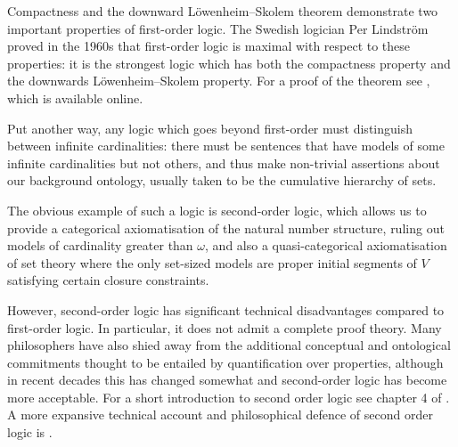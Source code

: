 \documentclass[10pt, a4paper, oneside]{article}
\theoremstyle{definition}
\theoremstyle{remark}
\theoremstyle{plain}
\theoremstyle{plain}
\begin{document}
Compactness and the downward Löwenheim--Skolem theorem demonstrate two
important properties of first-order logic. The Swedish logician Per Lindström
proved in the 1960s that first-order logic is maximal with respect to these
properties: it is the strongest logic which has both the compactness property
and the downwards Löwenheim--Skolem property. For a proof of the theorem see
\citet{vaananen2010}, which is available online.

Put another way, any logic which goes beyond first-order must distinguish
between infinite cardinalities: there must be sentences that have models of
some infinite cardinalities but not others, and thus make non-trivial assertions
about our background ontology, usually taken to be the cumulative hierarchy of
sets.

The obvious example of such a logic is second-order logic, which allows us to
provide a categorical axiomatisation of the natural number structure, ruling out
models of cardinality greater than $\omega$, and also a quasi-categorical
axiomatisation of set theory where the only set-sized models are proper initial
segments of $V$ satisfying certain closure constraints.

However, second-order logic has significant technical disadvantages compared to
first-order logic. In particular, it does not admit a complete proof theory.
Many philosophers have also shied away from the additional conceptual and
ontological commitments thought to be entailed by quantification over
properties, although in recent decades this has changed somewhat and
second-order logic has become more acceptable. For a short introduction to
second order logic see chapter 4 of \citet{vdalen2004}. A more expansive
technical account and philosophical defence of second order logic is
\citet{shapiro2000}.



\end{document}
